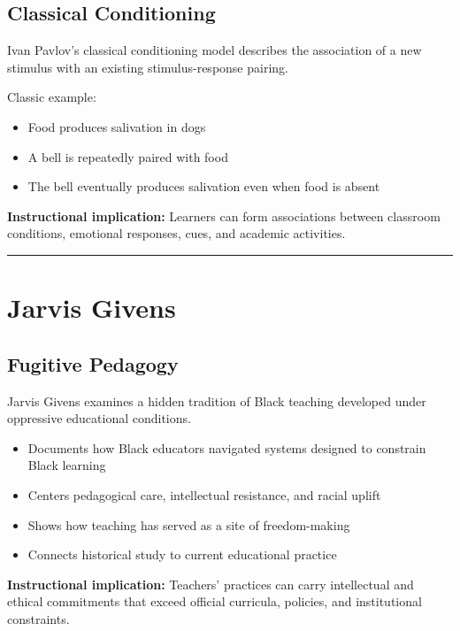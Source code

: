 \documentclass[
  letterpaper,
  DIV=11,
  numbers=noendperiod]{scrartcl}
\providecommand{\tightlist}{%
  \setlength{\itemsep}{0pt}\setlength{\parskip}{0pt}}\usepackage{longtable,booktabs,array}
\begin{document}
\subsection{Classical Conditioning}\label{classical-conditioning}

Ivan Pavlov's classical conditioning model describes the association of
a new stimulus with an existing stimulus-response pairing.

Classic example:

\begin{itemize}
\tightlist
\item
  Food produces salivation in dogs
\item
  A bell is repeatedly paired with food
\item
  The bell eventually produces salivation even when food is absent
\end{itemize}

\textbf{Instructional implication:} Learners can form associations
between classroom conditions, emotional responses, cues, and academic
activities.

\begin{center}\rule{0.5\linewidth}{0.5pt}\end{center}

\section{Jarvis Givens}\label{jarvis-givens}

\subsection{Fugitive Pedagogy}\label{fugitive-pedagogy}

Jarvis Givens examines a hidden tradition of Black teaching developed
under oppressive educational conditions.

\begin{itemize}
\tightlist
\item
  Documents how Black educators navigated systems designed to constrain
  Black learning
\item
  Centers pedagogical care, intellectual resistance, and racial uplift
\item
  Shows how teaching has served as a site of freedom-making
\item
  Connects historical study to current educational practice
\end{itemize}

\textbf{Instructional implication:} Teachers' practices can carry
intellectual and ethical commitments that exceed official curricula,
policies, and institutional constraints.
\end{document}
